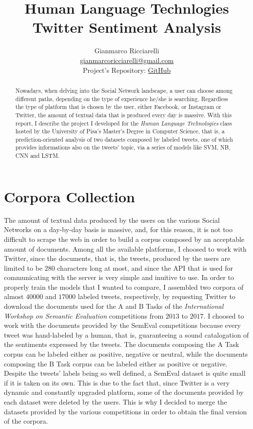 \documentclass[11pt,twocolumn]{article}
\title{\textbf{Human Language Technlogies \\ Twitter Sentiment Analysis}}
\author{Gianmarco Ricciarelli \\ \href{mailto:gianmarcoricciarelli@gmail.com}{gianmarcoricciarelli@gmail.com}\\
Project's Repository: \href{https://github.com/germz01/twitter_sentiment_analysis}{GitHub}}
\date{}
\begin{document}
    \maketitle

    \begin{abstract}
        \noindent
        Nowadays, when delving into the Social Network landscape, a user can choose among different
        paths, depending on the type of experience he/she is searching. Regardless the type of platform that
        is chosen by the user, either Facebook, or Instagram or Twitter, the amount of textual data that is
        produced every day is massive. With this report, I describe the project I developed for the
        \textit{Human Language Technologies} class hosted by the University of Pisa's Master's Degree in
        Computer Science, that is, a prediction-oriented analysis of two datasets composed by labeled tweets,
        one of which provides informations also on the tweets' topic, via a series of models like SVM, NB, CNN
        and LSTM.
    \end{abstract}

    \section{Corpora Collection} %
    \label{sec:corpus_collection}
        The amount of textual data produced by the users on the various Social Networks on a day-by-day
        basis is massive, and, for this reason, it is not too difficult to scrape the web in order to
        build a corpus composed by an acceptable amount of documents. Among all the available platforms, I
        choosed to work with Twitter, since the documents, that is, the tweets, produced by the users are
        limited to be $280$ characters long at most, and since the API that is used for communicating with
        the server is very simple and inuitive to use. In order to properly train the models that I
        wanted to compare, I assembled two corpora of almost $40000$ and $17000$ labeled tweets, respectively, by
        requesting Twitter to download the documents used for the A and B Tasks of the
        \textit{International Workshop on Semantic Evaluation} competitions from $2013$ to $2017$.
        I choosed to work with the documents provided by the SemEval
        competitions because every tweet was hand-labeled by a human, that is, guaranteeing a sound
        catalogation of the sentiments expressed by the tweets. The documents composing the A Task corpus can be
        labeled either as positive, negative or neutral, while the documents composing the B Task corpus can be
        labeled either as positive or negative. Despite the tweets' labels being so well defined, a SemEval
        dataset is quite small if it is taken on its own. This is due to the fact that, since Twitter is a
        very dynamic and constantly upgraded platform, some of the documents provided by each dataset
        were deleted by the users. This is why I decided to merge the datasets provided by the various
        competitions in order to obtain the final version of the corpora.
\end{document}
